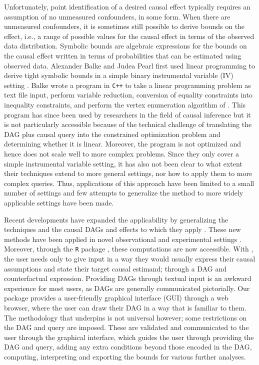 Unfortunately, point identification of a desired causal effect typically requires an assumption of no unmeasured confounders, in some form. When there are unmeasured confounders, it is sometimes still possible to derive bounds on the effect, i.e., a range of possible values for the causal effect in terms of the observed data distribution. Symbolic bounds are algebraic expressions for the bounds on the causal effect written in terms of probabilities that can be estimated using observed data. Alexander Balke and Judea Pearl first used linear programming to derive tight symbolic bounds in a simple binary instrumental variable (IV) setting \citep{balke1997bounds}. Balke wrote a program in \texttt{C++} to take a linear programming problem as text file input, perform variable reduction, conversion of equality constraints into inequality constraints, and perform the vertex enumeration algorithm of \citet{mattheiss1973algorithm}. This program has since been used by researchers in the field of causal inference \citep{balke1997bounds, cai2008bounds, sjolander2009bounds, sjolander2014bounds} but it is not particularly accessible because of the technical challenge of translating the DAG plus causal query into the constrained optimization problem and determining whether it is linear. Moreover, the program is not optimized and hence does not scale well to more complex problems. Since they only cover a simple instrumental variable setting, it has also not been clear to what extent their techniques extend to more general settings, nor how to apply them to more complex queries. Thus, applications of this approach have been limited to a small number of settings and few attempts to generalize the method to more widely applicable settings have been made.

Recent developments have expanded the applicability by generalizing the techniques and the causal DAGs and effects to which they apply \citep{generalcausalbounds}. These new methods have been applied in novel observational and experimental settings \citep{gabriel2020causal, gabriel2021nonparametric, gabriel2022sharp}. Moreover, through the \texttt{R} package  \citep{causaloptim}, these computations are now accessible. With , the user needs only to give input in a way they would usually express their causal assumptions and state their target causal estimand; through a DAG and counterfactual expression. Providing DAGs through textual input is an awkward experience for most users, as DAGs are generally communicated pictorially. Our package  provides a user-friendly graphical interface (GUI) through a web browser, where the user can draw their DAG in a way that is familiar to them. The methodology that underpins  is not universal however; some restrictions on the DAG and query are imposed. These are validated and communicated to the user through the graphical interface, which guides the user through providing the DAG and query, adding any extra conditions beyond those encoded in the DAG, computing, interpreting and exporting the bounds for various further analyses.

